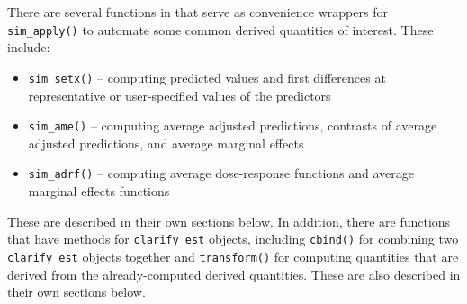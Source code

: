 There are several functions in  that serve as convenience wrappers for \texttt{sim\_apply()} to automate some common derived quantities of interest. These include:
\begin{itemize}
\item
  \texttt{sim\_setx()} -- computing predicted values and first differences at representative or user-specified values of the predictors
\item
  \texttt{sim\_ame()} -- computing average adjusted predictions, contrasts of average adjusted predictions, and average marginal effects
\item
  \texttt{sim\_adrf()} -- computing average dose-response functions and average marginal effects functions
\end{itemize}
These are described in their own sections below. In addition, there are functions that have methods for \texttt{clarify\_est} objects, including \texttt{cbind()} for combining two \texttt{clarify\_est} objects together and \texttt{transform()} for computing quantities that are derived from the already-computed derived quantities. These are also described in their own sections below.
